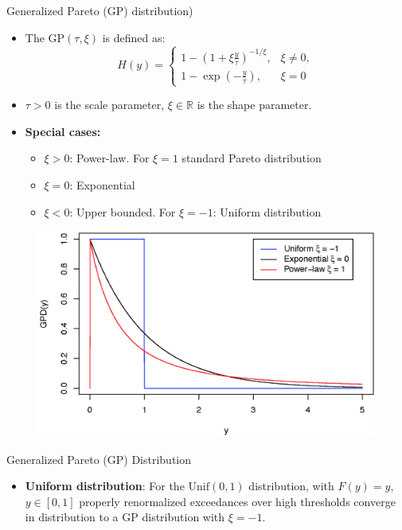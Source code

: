 \documentclass[10pt, hyperref={colorlinks = true,linkcolor = blue}]{beamer}
\begin{document}
{{\begin{frame}{Generalized Pareto (GP) distribution)}
\begin{itemize}
    \item The GP\((\tau, \xi)\) is defined as:
    \[
    H(y) =
    \begin{cases} 
        1 - \left(1 + \xi \frac{y}{\tau}\right)^{-1/\xi}, & \xi \neq 0, \\
        1 - \exp\left(-\frac{y}{\tau}\right), & \xi = 0
    \end{cases}
    \]

    \item \(\tau > 0\) is the scale parameter, \(\xi \in \mathbb{R}\) is the shape parameter.

        \item \textbf{Special cases:}
        \begin{itemize}
            \item \(\xi > 0\): Power-law. For $\xi=1$ standard Pareto distribution
            \item \(\xi = 0\): Exponential
            \item \(\xi < 0\): Upper bounded. For \(\xi = -1\): Uniform distribution 
        \end{itemize}
\end{itemize}
\vspace{-7mm}
\begin{figure}
\includegraphics[scale=0.35]{figures/Plot4.eps}
\end{figure}
\end{frame}



\begin{frame}{Generalized Pareto (GP) Distribution}
\begin{itemize}
    \item \textbf{Uniform distribution}:  For the \(\text{Unif}(0, 1)\) distribution, with \(F(y) = y\), \(y \in [0, 1]\) properly renormalized exceedances over high thresholds converge in distribution to a GP distribution with \(\xi = -1\).
    

\end{itemize}
\end{frame}}}
\end{document}
